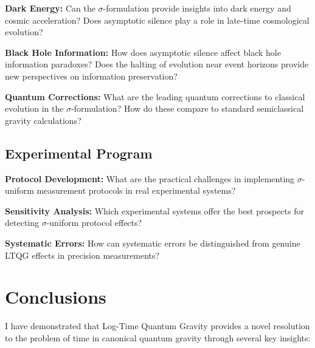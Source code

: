 \documentclass[12pt,a4paper]{article}
\begin{document}
\textbf{Dark Energy:} Can the $\sigma$-formulation provide insights into dark energy and cosmic acceleration? Does asymptotic silence play a role in late-time cosmological evolution?

\textbf{Black Hole Information:} How does asymptotic silence affect black hole information paradoxes? Does the halting of evolution near event horizons provide new perspectives on information preservation?

\textbf{Quantum Corrections:} What are the leading quantum corrections to classical evolution in the $\sigma$-formulation? How do these compare to standard semiclassical gravity calculations?

\subsection{Experimental Program}

\textbf{Protocol Development:} What are the practical challenges in implementing $\sigma$-uniform measurement protocols in real experimental systems?

\textbf{Sensitivity Analysis:} Which experimental systems offer the best prospects for detecting $\sigma$-uniform protocol effects?

\textbf{Systematic Errors:} How can systematic errors be distinguished from genuine LTQG effects in precision measurements?

\section{Conclusions}

I have demonstrated that Log-Time Quantum Gravity provides a novel resolution to the problem of time in canonical quantum gravity through several key insights:
\end{document}
